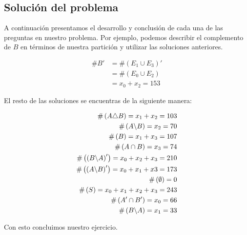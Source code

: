 \subsection{Solución del problema}

A continuación presentamos el desarrollo y conclusión de cada una de las preguntas en nuestro problema. Por ejemplo, podemos describir el complemento de $ B $ en términos de nuestra partición y utilizar las soluciones anteriores. 

\begin{align}
	\# B' 
	&= \#\left(E_1 \cup E_3\right)'\\
	&= \#\left(E_0 \cup E_2\right)\\
	&= x_0 + x_2 = 153
\end{align}

El resto de las soluciones se encuentras de la siguiente manera:

\begin{align}
	\#\left( A\triangle B \right) = x_1+x_2 = 103  \\
	\#\left( A\backslash B \right) = x_2 = 70 \\
	\#\left( B \right) = x_1+x_3=107	\\
	\#\left( A \cap B \right) = x_3 = 74 \\
	\#\left( \left(B\backslash A\right)' \right) 
	= x_0+x_2+x_3 = 210 \\
	\#\left( \left(A\backslash B\right)' \right)
	= x_0+x_1+x3 = 173 \\
	\#\left( \emptyset \right) = 0 \\
	\#\left( S \right) = x_0+x_1+x_2+x_3 = 243 \\
	\#\left( A' \cap B' \right) = x_0 = 66\\
	\#\left( B\backslash A \right) = x_1 = 33
\end{align}

Con esto concluimos nuestro ejercicio. 